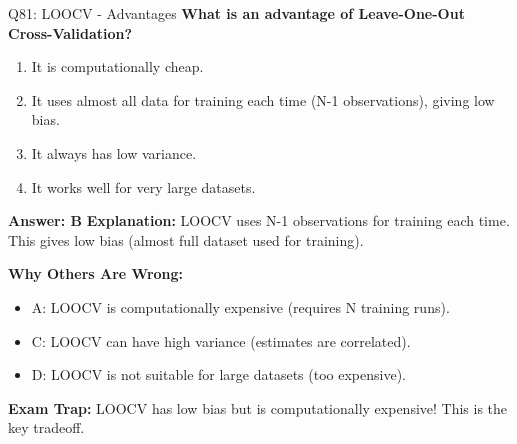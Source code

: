 \documentclass[8pt]{beamer}
\begin{document}
	\begin{frame}{Q81: LOOCV - Advantages}
		\fontsize{6.5}{7.5}\selectfont
		\textbf{What is an advantage of Leave-One-Out Cross-Validation?}
		
		\begin{enumerate}
			\item It is computationally cheap.
			\item It uses almost all data for training each time (N-1 observations), giving low bias.
			\item It always has low variance.
			\item It works well for very large datasets.
		\end{enumerate}
		
		\vspace{0.05cm}
		\textcolor{myblue}{\textbf{Answer: B}}
		\vspace{0.05cm}
		\textcolor{myblue}{\textbf{Explanation:}} LOOCV uses N-1 observations for training each time. This gives low bias (almost full dataset used for training).
		
		\vspace{0.05cm}
		\textcolor{myred}{\textbf{Why Others Are Wrong:}}
		\begin{itemize}
			\item \textcolor{myred}{A:} LOOCV is computationally expensive (requires N training runs).
			\item \textcolor{myred}{C:} LOOCV can have high variance (estimates are correlated).
			\item \textcolor{myred}{D:} LOOCV is not suitable for large datasets (too expensive).
		\end{itemize}
		
		\textcolor{myred}{\textbf{Exam Trap:}} LOOCV has \textcolor{myblue}{low bias} but is \textcolor{myred}{computationally expensive}! This is the key tradeoff.
	\end{frame}
	
\end{document}
